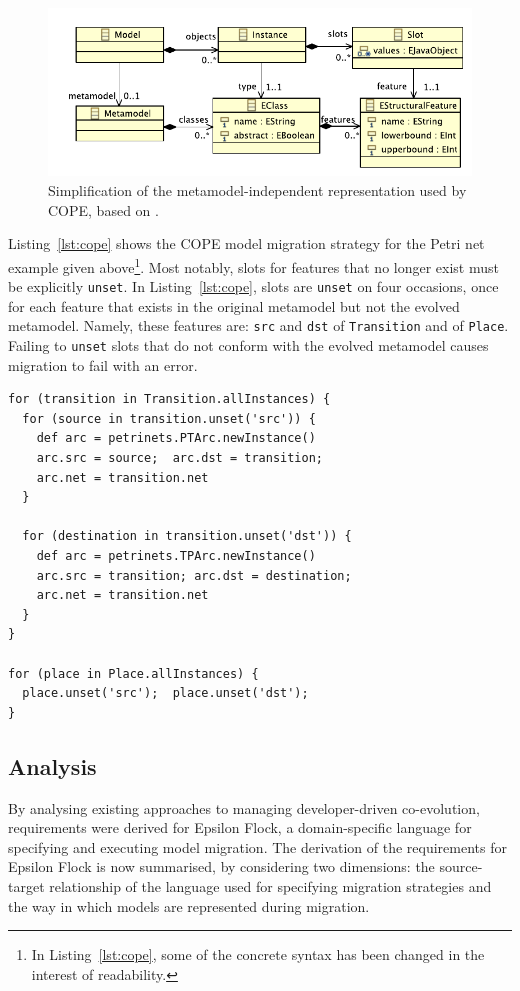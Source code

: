 \begin{figure}[tbp]
  \centering
  \includegraphics[scale=0.75]{5.Implementation/cope_mm.pdf}
  \caption{Simplification of the metamodel-independent representation used by COPE, based on \cite{herrmannsdoerfer09cope}.}
  \label{fig:cope_mmi}
\end{figure}

Listing~\ref{lst:cope} shows the COPE model migration strategy for the Petri net example given above\footnote{In Listing~\ref{lst:cope}, some of the concrete syntax has been changed in the interest of readability.}. Most notably, slots for features that no longer exist must be explicitly \texttt{unset}. In Listing~\ref{lst:cope}, slots are \texttt{unset} on four occasions, once for each feature that exists in the original metamodel but not the evolved metamodel. Namely, these features are: \texttt{src} and \texttt{dst} of \texttt{Transition} and of \texttt{Place}. Failing to \texttt{unset} slots that do not conform with the evolved metamodel causes migration to fail with an error.

\begin{lstlisting}[caption=Petri nets model migration in COPE, label=lst:cope, language=COPE]
for (transition in Transition.allInstances) {
  for (source in transition.unset('src')) {
    def arc = petrinets.PTArc.newInstance()
    arc.src = source;  arc.dst = transition;
    arc.net = transition.net
  }

  for (destination in transition.unset('dst')) {
    def arc = petrinets.TPArc.newInstance() 
    arc.src = transition; arc.dst = destination;
    arc.net = transition.net
  }
}

for (place in Place.allInstances) {
  place.unset('src');  place.unset('dst');
}
\end{lstlisting}


\subsection{Analysis}
\label{subsec:analysis}
By analysing existing approaches to managing developer-driven co-evolution, requirements were derived for Epsilon Flock, a domain-specific language for specifying and executing model migration. The derivation of the requirements for Epsilon Flock is now summarised, by considering two dimensions: the source-target relationship of the language used for specifying migration strategies and the way in which models are represented during migration. %


